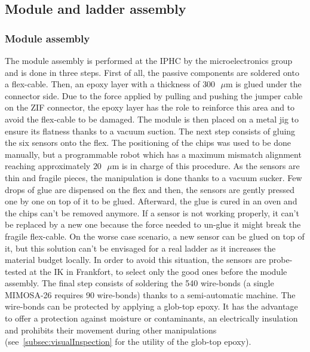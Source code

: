   \subsection{Module and ladder assembly}

    \subsubsection{Module assembly}
    \label{subsec:modAssembly}

    The module assembly is performed at the IPHC by the microelectronics group and is done in three steps.
    First of all, the passive components are soldered onto a flex-cable.
    Then, an epoxy layer with a thickness of $300 \text{ }\mu\text{m}$ is glued under the connector side.
    Due to the force applied by pulling and pushing the jumper cable on the ZIF connector, the epoxy layer has the role to reinforce this area and to avoid the flex-cable to be damaged.
    The module is then placed on a metal jig to ensure its flatness thanks to a vacuum suction.
    The next step consists of gluing the six sensors onto the flex.
    The positioning of the chips was used to be done manually, but a programmable robot which has a maximum mismatch alignment reaching approximately $20 \text{ }\mu\text{m}$ is in charge of this procedure.
    As the sensors are thin and fragile pieces, the manipulation is done thanks to a vacuum sucker.
    Few drops of glue are dispensed on the flex and then, the sensors are gently pressed one by one on top of it to be glued.
    Afterward, the glue is cured in an oven and the chips can't be removed anymore.
    If a sensor is not working properly, it can't be replaced by a new one because the force needed to un-glue it might break the fragile flex-cable.
    On the worse case scenario, a new sensor can be glued on top of it, but this solution can't be envisaged for a real ladder as it increases the material budget locally.
    In order to avoid this situation, the sensors are probe-tested at the IK in Frankfort, to select only the good ones before the module assembly.
    The final step consists of soldering the 540 wire-bonds (a single MIMOSA-26 requires 90 wire-bonds) thanks to a semi-automatic machine.
    The wire-bonds can be protected by applying a glob-top epoxy.
    It has the advantage to offer a protection against moisture or contaminants, an electrically insulation and prohibits their movement during other manipulations (see~\ref{subsec:visualInspection} for the utility of the glob-top epoxy). 
